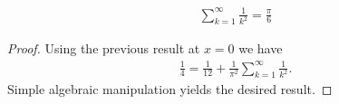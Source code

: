 \documentclass{article}
\begin{document}
\begin{claim*}[4d]
  \begin{align*}
    \sum_{k=1}^\infty \frac{1}{k^2}=\frac{\pi}{6}
  \end{align*}
  \begin{proof}
    Using the previous result at $x=0$ we have
    \begin{align*}
      \frac{1}{4}=\frac{1}{12}+\frac{1}{\pi^2}\sum_{k=1}^\infty\frac{1}{k^2}.
    \end{align*}
    Simple algebraic manipulation yields the desired result.
  \end{proof}
\end{claim*}
\end{document}

